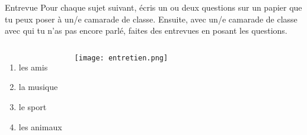 \begin{frame}{Entrevue}
  Pour chaque sujet suivant, écris un ou deux questions sur un papier que tu peux poser à un/e camarade de classe.
  Ensuite, avec un/e camarade de classe avec qui tu n'as pas encore parlé, faites des entrevues en posant les questions.  \\
  \begin{columns}
      \begin{enumerate}
        \item les amis
        \item la musique
        \item le sport
        \item les animaux
      \end{enumerate}
      \begin{center}
        \texttt{[image: entretien.png]}
      \end{center}
  \end{columns}
\end{frame}